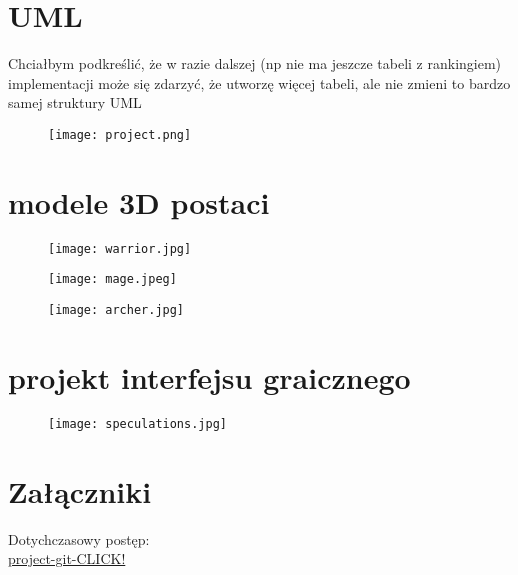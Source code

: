 \documentclass[11pt]{article}
\begin{document}
\begin{flushleft}
\section{UML}
Chciałbym podkreślić, że w razie dalszej (np nie ma jeszcze tabeli z rankingiem) implementacji może się zdarzyć, że utworzę więcej tabeli, ale nie zmieni to bardzo samej struktury UML
\begin{figure}[!htbp]
  \begin{minipage}[b]{1.0\textwidth}
    \centering
    \texttt{[image: project.png]}
      \end{minipage}\hfill
\end{figure}
\section{modele 3D postaci}
\begin{figure}[!htbp]
\begin{minipage}[b]{1.0\textwidth}
    \centering
    \texttt{[image: warrior.jpg]}
  \end{minipage}\hfill
      \begin{minipage}[b]{1.0\textwidth}
    \centering
    \texttt{[image: mage.jpeg]}
  \end{minipage}\hfill
      \begin{minipage}[b]{1.0\textwidth}
    \centering
    \texttt{[image: archer.jpg]}
  \end{minipage}\hfill
\end{figure}
\section{projekt interfejsu graicznego}
\begin{figure}[H]
\begin{minipage}[b]{1.0\textwidth}
    \centering
    \texttt{[image: speculations.jpg]}
  \end{minipage}\hfill
\end{figure}
\section{Załączniki}
Dotychczasowy postęp:\\
\href{https://github.com/sqoshi/database-project}{project-git-CLICK!} 
\end{flushleft}
\end{document}
